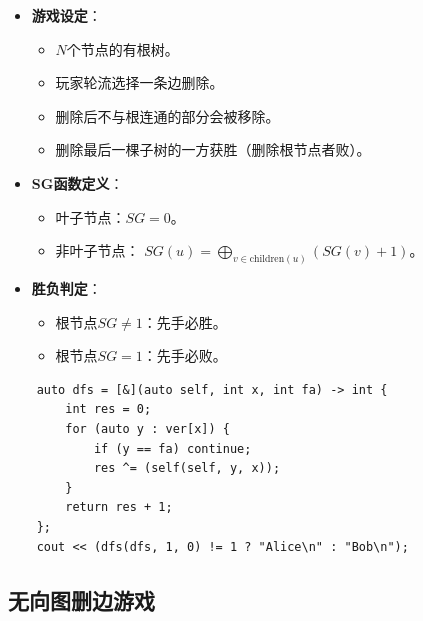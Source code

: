 \documentclass[a4paper,12pt]{article}
\begin{document}
\begin{itemize}
    \item \textbf{游戏设定}：
    \begin{itemize}
        \item $N$个节点的有根树。
        \item 玩家轮流选择一条边删除。
        \item 删除后不与根连通的部分会被移除。
        \item 删除最后一棵子树的一方获胜（删除根节点者败）。
    \end{itemize}

    \item \textbf{SG函数定义}：
    \begin{itemize}
        \item 叶子节点：$SG=0$。
        \item 非叶子节点：
        \( SG(u) = \bigoplus_{v \in \text{children}(u)} (SG(v) + 1) \)。
    \end{itemize}

    \item \textbf{胜负判定}：
    \begin{itemize}
        \item 根节点$SG \neq 1$：先手必胜。
        \item 根节点$SG = 1$：先手必败。
    \end{itemize}
\end{itemize}

\begin{lstlisting}
    auto dfs = [&](auto self, int x, int fa) -> int {
        int res = 0;
        for (auto y : ver[x]) {
            if (y == fa) continue;
            res ^= (self(self, y, x));
        }
        return res + 1;
    };
    cout << (dfs(dfs, 1, 0) != 1 ? "Alice\n" : "Bob\n");
\end{lstlisting}

\subsection{无向图删边游戏}
\end{document}
